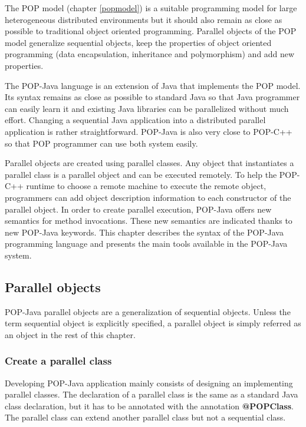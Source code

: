 \label{dev}

The POP model (chapter \ref{popmodel}) is a suitable programming model for large heterogeneous distributed environments but it should also remain as close as possible to traditional object oriented programming. Parallel objects of the POP model generalize sequential objects, keep the properties of object oriented programming (data encapsulation, inheritance and polymorphism) and add new properties.\s

The POP-Java language is an extension of Java that implements the POP model. Its syntax remains as close as possible to standard Java so that Java programmer can easily learn it and existing Java libraries can be parallelized without much effort. Changing a sequential Java application into a distributed parallel application is rather straightforward. POP-Java is also very close to POP-C++ so that POP programmer can use both system easily.\s

Parallel objects are created using parallel classes. Any object that instantiates a parallel class is a parallel object and can be executed remotely. To help the POP-C++ runtime to choose a remote machine to execute the remote object, programmers can add object description information to each constructor of the parallel object. In order to create parallel execution, POP-Java offers new semantics for method invocations. These new semantics are indicated thanks to new POP-Java keywords. This chapter describes the syntax of the POP-Java programming language and presents the main tools available in the POP-Java system.


\subsection{Parallel objects}
POP-Java parallel objects are a generalization of sequential objects. Unless the term sequential object is explicitly specified, a parallel object is simply referred as an object in the rest of this chapter.

\subsubsection{Create a parallel class}
Developing POP-Java application mainly consists of designing an implementing parallel classes.
The declaration of a parallel class is the same as a standard Java class declaration, but it has to be annotated
with the annotation \textbf{@POPClass}.
The parallel class can extend another parallel class but not a sequential class.\s

